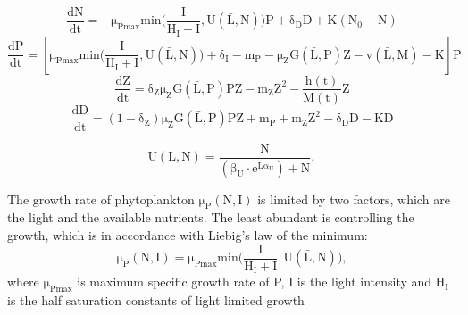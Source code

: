 \begin{equation}
    \label{eq:Ndynamicsrand}
    \mathrm{\frac{dN}{dt} = -\mu_{Pmax}min\bigg(\frac{I}{H_I+I},U(\bar{L},N)\bigg)P+\delta_D D+K(N_0-N)}
\end{equation}
\begin{equation}
    \label{eq:Pdynamicsrand}
    \mathrm{\frac{dP}{dt} = \left[ \mu_{Pmax}min\bigg(\frac{I}{H_I+I},U(\bar{L},N)\bigg)+\delta_I-m_P-\mu_ZG(\bar{L},P)Z-v(\bar{L},M)-K \right] P}
\end{equation}
\begin{equation}
    \label{eq:Zdynamicsrand}
    \mathrm{\frac{dZ}{dt} = \delta_Z\mu_Z G(\bar{L},P)PZ-m_Z Z^2 - \frac{h(t)}{M(t)}Z}
\end{equation}
\begin{equation}
    \label{eq:Ddynamicsrand}
    \mathrm{\frac{dD}{dt} = (1-\delta_Z)\mu_Z G(\bar{L},P)PZ+m_P+m_Z Z^2-\delta_D D-KD}
\end{equation}

\begin{equation}
    \label{eq:nutrientuptakerand}
    \mathrm{U(L,N) = \frac{N}{(\beta_U\cdot e^{L\alpha_U})+N}},
\end{equation}



The growth rate of phytoplankton $\mathrm{\mu_P(N,I)}$ is limited by two factors, which are the light and the available nutrients. The least abundant is controlling the growth, which is in accordance with Liebig's law of the minimum:
\begin{equation}
    \label{eq:growthrate}
    \mathrm{\mu_P(N,I) = \mu_{Pmax}min\bigg(\frac{I}{H_I+I},U(\bar{L},N)\bigg)},
\end{equation}
where $\mathrm{\mu_{Pmax}}$ is maximum specific growth rate of P, I is the light intensity and $\mathrm{H_{I}}$ is the half saturation constants of light limited growth